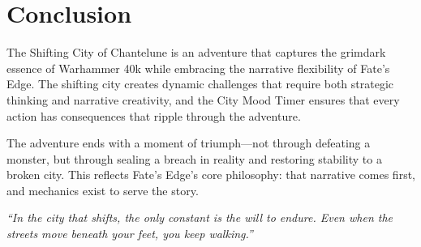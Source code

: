 \documentclass{article}
\begin{document}
\section{Conclusion}

The Shifting City of Chantelune is an adventure that captures the grimdark essence of Warhammer 40k while embracing the narrative flexibility of Fate's Edge. The shifting city creates dynamic challenges that require both strategic thinking and narrative creativity, and the City Mood Timer ensures that every action has consequences that ripple through the adventure.

The adventure ends with a moment of triumph---not through defeating a monster, but through sealing a breach in reality and restoring stability to a broken city. This reflects Fate's Edge's core philosophy: that narrative comes first, and mechanics exist to serve the story.

\begin{center}
\textit{``In the city that shifts, the only constant is the will to endure. Even when the streets move beneath your feet, you keep walking.''}
\end{center}
\end{document}
